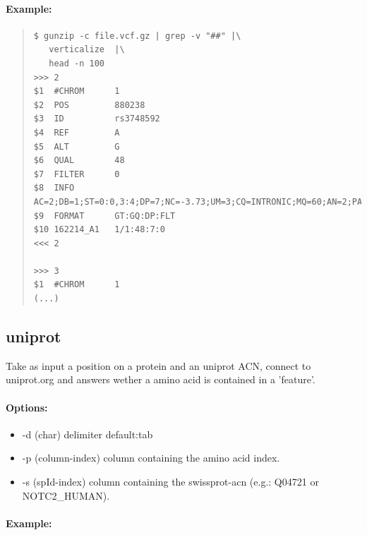 \documentclass[12pt]{article}
\begin{document}
\paragraph{Example:}
\begin{quote}
\begin{verbatim}
$ gunzip -c file.vcf.gz | grep -v "##" |\
   verticalize  |\
   head -n 100
>>>	2
$1	#CHROM   	1
$2	POS      	880238
$3	ID       	rs3748592
$4	REF      	A
$5	ALT      	G
$6	QUAL     	48
$7	FILTER   	0
$8	INFO     	AC=2;DB=1;ST=0:0,3:4;DP=7;NC=-3.73;UM=3;CQ=INTRONIC;MQ=60;AN=2;PA=1^1:0.930&2^1:0.860&3^1:0.950;MZ=0;GN=NOC2L;PS=1
$9	FORMAT   	GT:GQ:DP:FLT
$10	162214_A1	1/1:48:7:0
<<<	2

>>>	3
$1	#CHROM   	1
(...)
\end{verbatim}
\end{quote}

\subsection{uniprot}
Take as input a position on a protein and an uniprot ACN, connect to uniprot.org and answers wether a amino acid is contained in a 'feature'.
\paragraph{Options:}
\begin{itemize}
\item-d (char) delimiter default:tab
\item-p (column-index) column containing the amino acid index.
\item-s (spId-index) column containing the swissprot-acn  (e.g.: Q04721 or  NOTC2\_HUMAN).
\end{itemize}
\paragraph{Example:}
\end{document}

